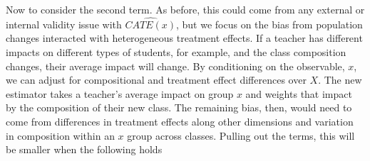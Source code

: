 \documentclass[12pt]{article}
\theoremstyle{definition}
\theoremstyle{definition}
\theoremstyle{definition}
\theoremstyle{definition}
\begin{document}
    
    
    

    Now to consider the second term. As before, this could come from any external or internal validity issue with $\widehat{CATE(x)}$, but we focus on the bias from population changes interacted with heterogeneous treatment effects. If a teacher has different impacts on different types of students, for example, and the class composition changes, their average impact will change. By conditioning on the observable, $x$, we can adjust for compositional and treatment effect differences over $X$. The new estimator takes a teacher's average impact on group $x$ and weights that impact by the composition of their new class. The remaining bias, then, would need to come from differences in treatment effects along other dimensions and variation in composition within an $x$ group across classes. Pulling out the terms, this will be smaller when the following holds
\end{document}
